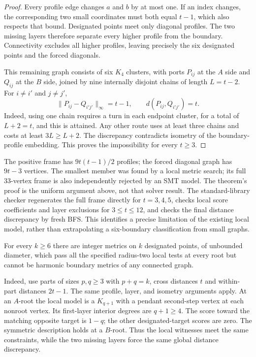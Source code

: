 \begin{proof}
Every profile edge changes $a$ and $b$ by at most one. If an index changes,
the corresponding two small coordinates must both equal $t-1$, which
also respects that bound. Designated points meet only diagonal profiles.
The two missing layers therefore separate every higher profile from the
boundary. Connectivity excludes all higher profiles, leaving precisely
the six designated points and the forced diagonals.

This remaining graph consists of six $K_4$ clusters, with ports
$P_{ij}$ at the $A$ side and $Q_{ij}$ at the $B$ side, joined by nine
internally disjoint chains of length $L=t-2$. For $i\ne i'$ and $j\ne j'$,
\[
 \|P_{ij}-Q_{i'j'}\|_\infty=t-1,
 \qquad d(P_{ij},Q_{i'j'})=t.
\]
Indeed, using one chain requires a turn in each endpoint cluster, for a
total of $L+2=t$, and this is attained. Any other route uses at least
three chains and costs at least $3L\ge L+2$. The discrepancy contradicts
isometry of the boundary-profile embedding. This proves the impossibility
for every $t\ge3$.
\end{proof}

The positive frame has $9t(t-1)/2$ profiles; the forced diagonal graph has
$9t-3$ vertices. The smallest member was found by a local metric search;
its full 33-vertex frame is also independently rejected by an SMT model.
The theorem's proof is the uniform argument above, not that solver result.
The standard-library checker regenerates the full frame directly for
$t=3,4,5$, checks local score coefficients and layer exclusions for
$3\le t\le12$, and checks the final distance discrepancy by fresh BFS.
This identifies a precise limitation of the existing local model, rather
than extrapolating a six-boundary classification from small graphs.

\begin{corollary}
For every $k\ge6$ there are integer metrics on $k$ designated points, of
unbounded diameter, which pass all the specified radius-two local tests
at every root but cannot be harmonic boundary metrics of any connected graph.
\end{corollary}
Indeed, use parts of sizes $p,q\ge3$ with $p+q=k$, cross distances $t$ and
within-part distances $2t-1$. The same profile, layer, and isometry arguments
apply. At an $A$-root the local model is a $K_{q+1}$ with a pendant
second-step vertex at each nonroot vertex. Its first-layer interior degrees
are $q+1\ge4$. The score toward the matching opposite target is $1-q$;
the other designated-target scores are zero. The symmetric description
holds at a $B$-root. Thus the local witnesses meet the same constraints,
while the two missing layers force the same global distance discrepancy.
